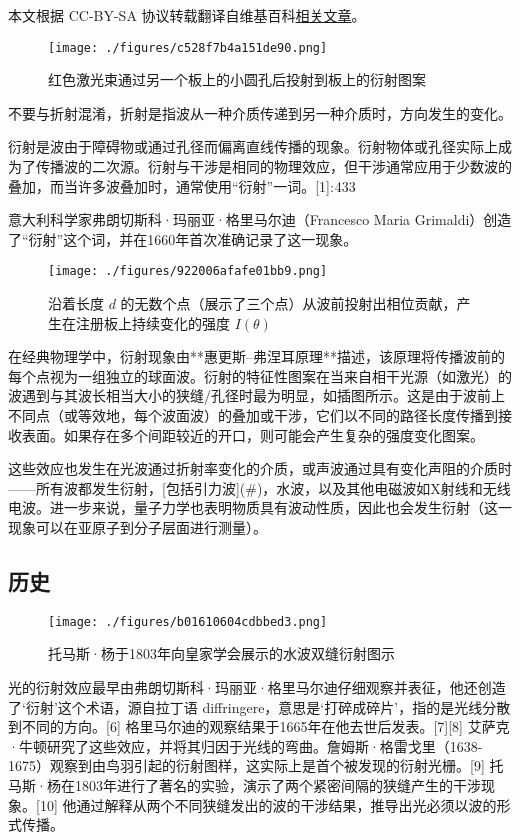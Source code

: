 
本文根据 CC-BY-SA 协议转载翻译自维基百科\href{https://en.wikipedia.org/wiki/Diffraction}{相关文章}。

\begin{figure}[ht]
\centering
\texttt{[image: ./figures/c528f7b4a151de90.png]}
\caption{红色激光束通过另一个板上的小圆孔后投射到板上的衍射图案} \label{fig_YS_1}
\end{figure}
不要与折射混淆，折射是指波从一种介质传递到另一种介质时，方向发生的变化。

衍射是波由于障碍物或通过孔径而偏离直线传播的现象。衍射物体或孔径实际上成为了传播波的二次源。衍射与干涉是相同的物理效应，但干涉通常应用于少数波的叠加，而当许多波叠加时，通常使用“衍射”一词。[1]: 433 

意大利科学家弗朗切斯科·玛丽亚·格里马尔迪（Francesco Maria Grimaldi）创造了“衍射”这个词，并在1660年首次准确记录了这一现象。
\begin{figure}[ht]
\centering
\texttt{[image: ./figures/922006afafe01bb9.png]}
\caption{沿着长度 \(d\) 的无数个点（展示了三个点）从波前投射出相位贡献，产生在注册板上持续变化的强度 \(I(\theta)\)} \label{fig_YS_2}
\end{figure}
在经典物理学中，衍射现象由**惠更斯–弗涅耳原理**描述，该原理将传播波前的每个点视为一组独立的球面波。衍射的特征性图案在当来自相干光源（如激光）的波遇到与其波长相当大小的狭缝/孔径时最为明显，如插图所示。这是由于波前上不同点（或等效地，每个波面波）的叠加或干涉，它们以不同的路径长度传播到接收表面。如果存在多个间距较近的开口，则可能会产生复杂的强度变化图案。

这些效应也发生在光波通过折射率变化的介质，或声波通过具有变化声阻的介质时——所有波都发生衍射，[包括引力波](#)，水波，以及其他电磁波如X射线和无线电波。进一步来说，量子力学也表明物质具有波动性质，因此也会发生衍射（这一现象可以在亚原子到分子层面进行测量）。
\subsection{历史}
\begin{figure}[ht]
\centering
\texttt{[image: ./figures/b01610604cdbbed3.png]}
\caption{托马斯·杨于1803年向皇家学会展示的水波双缝衍射图示} \label{fig_YS_3}
\end{figure}
光的衍射效应最早由弗朗切斯科·玛丽亚·格里马尔迪仔细观察并表征，他还创造了‘衍射’这个术语，源自拉丁语 diffringere，意思是‘打碎成碎片’，指的是光线分散到不同的方向。[6] 格里马尔迪的观察结果于1665年在他去世后发表。[7][8] 艾萨克·牛顿研究了这些效应，并将其归因于光线的弯曲。詹姆斯·格雷戈里（1638-1675）观察到由鸟羽引起的衍射图样，这实际上是首个被发现的衍射光栅。[9] 托马斯·杨在1803年进行了著名的实验，演示了两个紧密间隔的狭缝产生的干涉现象。[10] 他通过解释从两个不同狭缝发出的波的干涉结果，推导出光必须以波的形式传播。

